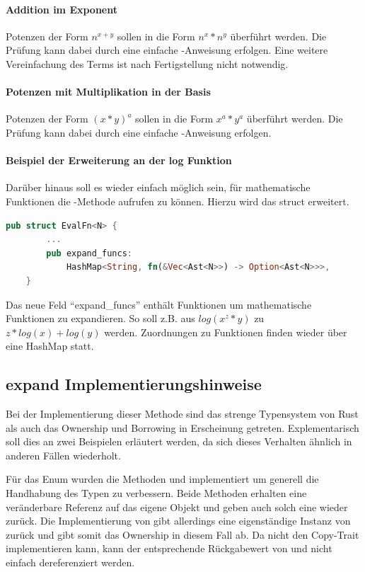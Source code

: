 \documentclass[11pt,a4paper, ngerman]{article}
\begin{document}
\paragraph{Addition im Exponent} Potenzen der Form $n^{x+y}$ sollen in die Form $n^x*n^y$ überführt werden. Die Prüfung kann dabei durch eine einfache -Anweisung erfolgen. Eine weitere Vereinfachung des Terms ist nach Fertigstellung nicht notwendig.

\paragraph{Potenzen mit Multiplikation in der Basis} Potenzen der Form $(x*y)^a$ sollen in die Form $x^a*y^a$ überführt werden. Die Prüfung kann dabei durch eine einfache -Anweisung erfolgen.

\paragraph{Beispiel der Erweiterung an der log Funktion} Darüber hinaus soll es wieder einfach möglich sein, für mathematische Funktionen die -Methode aufrufen zu können. Hierzu wird das struct  erweitert.

\begin{lstlisting}[language=rust, caption={EvalFn nach expand}]
    pub struct EvalFn<N> {
        ...
        pub expand_funcs: 
            HashMap<String, fn(&Vec<Ast<N>>) -> Option<Ast<N>>>,
    }
\end{lstlisting}

Das neue Feld ``expand\_funcs'' enthält Funktionen um mathematische Funktionen zu expandieren. So soll z.B. aus $log(x^z*y)$ zu $z*log(x)+log(y)$ werden. Zuordnungen zu Funktionen finden wieder über eine HashMap statt.

\subsection{expand Implementierungshinweise}
Bei der Implementierung dieser Methode sind das strenge Typensystem von Rust als auch das Ownership und Borrowing in Erscheinung getreten. Explementarisch soll dies an zwei Beispielen erläutert werden, da sich dieses Verhalten ähnlich in anderen Fällen wiederholt.

Für das Enum  wurden die Methoden  und  implementiert um generell die Handhabung des Typen zu verbessern. Beide Methoden erhalten eine veränderbare Referenz auf das eigene Objekt und geben auch solch eine wieder zurück. Die Implementierung von  gibt allerdings eine eigenständige Instanz von  zurück und gibt somit das Ownership in diesem Fall ab. Da  nicht den Copy-Trait implementieren kann, kann der entsprechende Rückgabewert von  und  nicht einfach dereferenziert werden.
\end{document}
